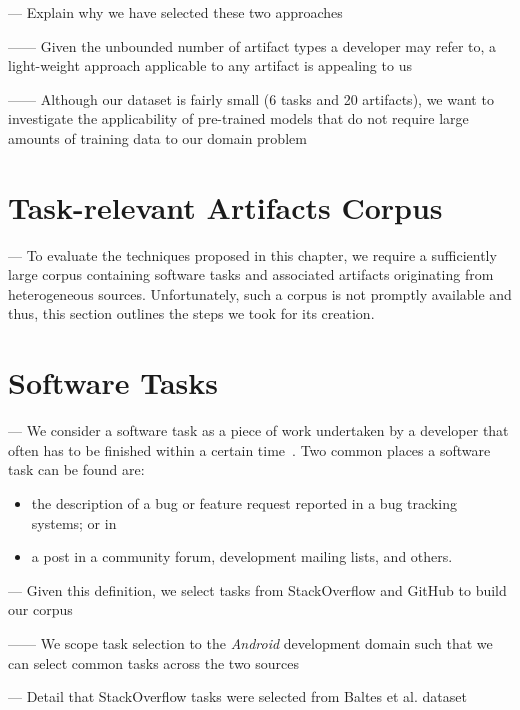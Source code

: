 \clearpage

--- Explain why we have selected these two approaches

------ Given the unbounded number of artifact types a developer may refer to, a light-weight approach applicable to any artifact is appealing to us

------ Although our dataset is fairly small (6 tasks and 20 artifacts), we want to investigate 
the applicability of pre-trained models that do not require large amounts of training data
to our domain problem~\cite{devlin2018bert, Ye2016, Bavota2016}

\section{Task-relevant Artifacts Corpus}

--- To evaluate the techniques proposed in this chapter, we require a sufficiently large corpus containing 
software tasks and associated artifacts originating from heterogeneous sources.
Unfortunately, such a corpus is not promptly available and thus, 
this section outlines the steps we took for its creation.


\section{Software Tasks}

--- We consider a software task as a piece of work undertaken by a developer that often has to be finished within a certain time~\cite{2004merriam}. 
Two common places a software task can be found are:

\begin{itemize}
    \item the description of a bug or feature request reported in a bug tracking systems; or in
    \item a post in a community forum, development mailing lists, and others.
\end{itemize}

\vspace{3mm}

--- Given this definition, we select tasks from StackOverflow and GitHub to build our corpus

------ We scope task selection to the \textit{Android} development domain such that we can select common tasks across the two sources \vspace{3mm}



--- Detail that StackOverflow tasks were selected from Baltes et al. dataset~\cite{baltes2019-rep}

